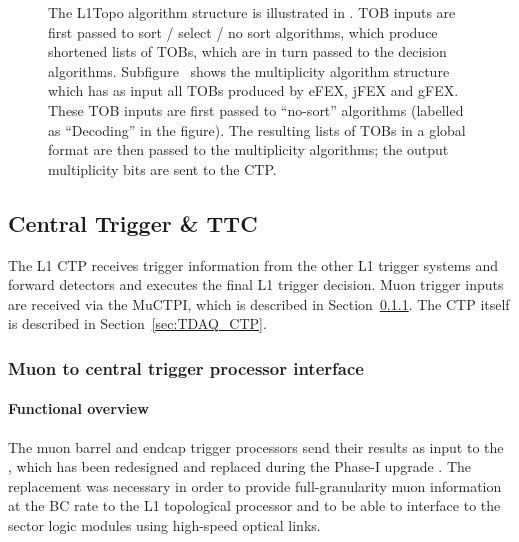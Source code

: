 \documentclass[cernpreprint, atlasdraft=false, UKenglish,british,orcidlogo, texmf, orcidlogo]{atlasdoc}
\begin{document}
\begin{figure}[htbp!]
\centering
{}
\caption{The \gls{L1Topo} algorithm structure is illustrated in \protect{}. \gls{TOB} inputs are first passed to sort / select / no sort algorithms, which produce shortened lists of \glspl{TOB}, which are in turn passed to the decision algorithms. Subfigure~\protect{} shows the multiplicity algorithm structure
which has as input all \glspl{TOB} produced by \gls{eFEX}, \gls{jFEX} and \gls{gFEX}.   These \gls{TOB} inputs are first passed to ``no-sort'' algorithms (labelled as ``Decoding'' in the figure).  The resulting lists of \glspl{TOB} in a global format are then passed to the multiplicity algorithms; the output multiplicity bits are sent to the \gls{CTP}.
}
\label{fig:TDAQL1TopoAlgoBlockDiagram}
\end{figure}
 
 
\subsection{Central Trigger \& TTC} 
The \gls{L1} \gls{CTP} receives trigger information from the other \gls{L1} trigger systems and forward detectors and executes the final \gls{L1} trigger decision.  Muon trigger inputs are received via the \gls{MuCTPI}, which is described in Section~\ref{sec:TDAQ_MUCTPI}. The \gls{CTP} itself is described in Section~\ref{sec:TDAQ_CTP}.
 
\subsubsection{Muon to central trigger processor interface}\label{sec:TDAQ_MUCTPI}
\paragraph{Functional overview}
The muon barrel and endcap trigger processors send their results as input to the
, which has been redesigned and replaced during the Phase-I upgrade \cite{bib:muctpi-phase1}.  The replacement was necessary in order to provide full-granularity muon information at the \gls{BC} rate to the \gls{L1} topological processor and to be able to interface to the sector logic modules using high-speed optical links.
 
\end{document}
